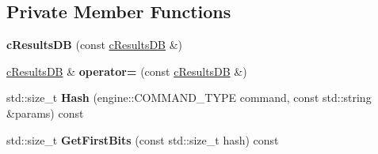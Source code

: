 \subsection*{Private Member Functions}
\begin{DoxyCompactItemize}
\item 
\hypertarget{classresultsDB_1_1cResultsDB_ab0f4d48abc214a3156fadafd6ef4cd5c}{{\bfseries c\-Results\-D\-B} (const \hyperlink{classresultsDB_1_1cResultsDB}{c\-Results\-D\-B} \&)}\label{classresultsDB_1_1cResultsDB_ab0f4d48abc214a3156fadafd6ef4cd5c}

\item 
\hypertarget{classresultsDB_1_1cResultsDB_abb3d112babc66b7f4fb4830ae10781f8}{\hyperlink{classresultsDB_1_1cResultsDB}{c\-Results\-D\-B} \& {\bfseries operator=} (const \hyperlink{classresultsDB_1_1cResultsDB}{c\-Results\-D\-B} \&)}\label{classresultsDB_1_1cResultsDB_abb3d112babc66b7f4fb4830ae10781f8}

\item 
\hypertarget{classresultsDB_1_1cResultsDB_ab7f64a509aed66ef34c3edb2dc32877c}{std\-::size\-\_\-t {\bfseries Hash} (engine\-::\-C\-O\-M\-M\-A\-N\-D\-\_\-\-T\-Y\-P\-E command, const std\-::string \&params) const }\label{classresultsDB_1_1cResultsDB_ab7f64a509aed66ef34c3edb2dc32877c}

\item 
\hypertarget{classresultsDB_1_1cResultsDB_a7e9e30b06267f3fccb1cfbc12888c9bd}{std\-::size\-\_\-t {\bfseries Get\-First\-Bits} (const std\-::size\-\_\-t hash) const }\label{classresultsDB_1_1cResultsDB_a7e9e30b06267f3fccb1cfbc12888c9bd}

\end{DoxyCompactItemize}
